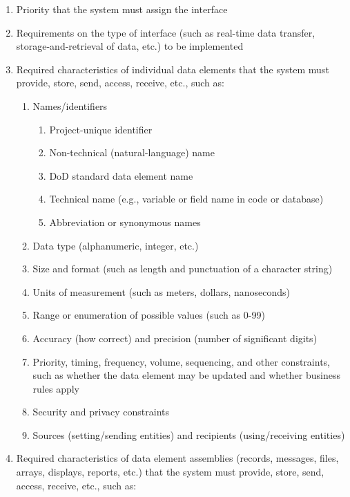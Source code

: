 \documentclass{fidata-report-template}
\begin{document}
\begin{enumerate}
\itemsep1pt\parskip0pt
\item
  Priority that the system must assign the interface
\item
  Requirements on the type of interface (such as real-time data
  transfer, storage-and-retrieval of data, etc.) to be implemented
\item
  Required characteristics of individual data elements that the system
  must provide, store, send, access, receive, etc., such as:

  \begin{enumerate}
  \itemsep1pt\parskip0pt
  \item
    Names/identifiers

    \begin{enumerate}
    \itemsep1pt\parskip0pt
    \item
      Project-unique identifier
    \item
      Non-technical (natural-language) name
    \item
      DoD standard data element name
    \item
      Technical name (e.g., variable or field name in code or database)
    \item
      Abbreviation or synonymous names
    \end{enumerate}
  \item
    Data type (alphanumeric, integer, etc.)
  \item
    Size and format (such as length and punctuation of a character
    string)
  \item
    Units of measurement (such as meters, dollars, nanoseconds)
  \item
    Range or enumeration of possible values (such as 0-99)
  \item
    Accuracy (how correct) and precision (number of significant digits)
  \item
    Priority, timing, frequency, volume, sequencing, and other
    constraints, such as whether the data element may be updated and
    whether business rules apply
  \item
    Security and privacy constraints
  \item
    Sources (setting/sending entities) and recipients (using/receiving
    entities)
  \end{enumerate}
\item
  Required characteristics of data element assemblies (records,
  messages, files, arrays, displays, reports, etc.) that the system must
  provide, store, send, access, receive, etc., such as:


\end{enumerate}
\end{document}
